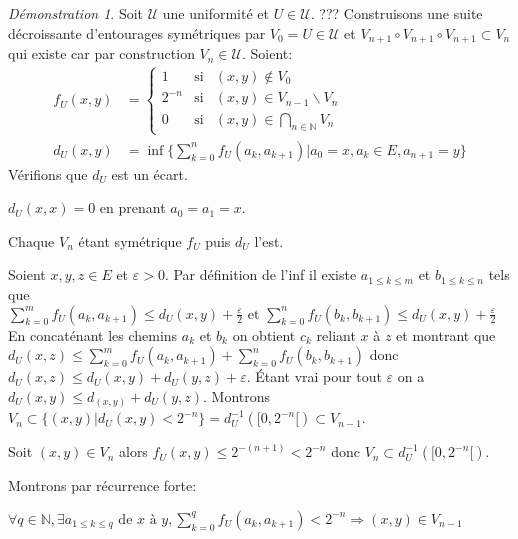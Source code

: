 \documentclass[a4paper, 11pt, french]{book}
\newenvironment{itemise}{\itemize}{\enditemize}
\theoremstyle{plain} %
\theoremstyle{definition} %
\theoremstyle{remark} %
\newtheorem*{demonstration}{Démonstration}
\renewcommand{\setminus}{\backslash}
\newcommand{\1}{\mathds{1}}
\newcommand{\infegal}{\leqslant}
\newcommand{\inv}[1]{#1^{-1}}
\newcommand\et{\text{ et }}
\newcommand{\N}{\mathbb{N}}
\begin{document}
\begin{demonstration}
	\begin{itemise}
		\item Soit $\mathscr{U}$ une uniformité et $U\in\mathscr{U}$. {\color{red} ???}
		Construisons une suite décroissante d'entourages symétriques par $V_0=U\in\mathscr{U}$ et $V_{n+1}\circ V_{n+1}\circ V_{n+1}\subset V_n$ qui existe car par construction $V_n\in\mathscr{U}$.
		Soient:
		\begin{align*}
			f_U(x, y) & =
			\left\{\begin{array}{lll}
				1      & \text{si} & (x, y)\notin V_0               \\
				2^{-n} & \text{si} & (x, y)\in V_{n-1}\setminus V_n \\
				0      & \text{si} & (x, y)\in\bigcap_{n\in\N} V_n
			\end{array}\right.\\
			d_U(x, y) & =\inf\{\sum_{k=0}^nf_U(a_k, a_{k+1})|a_0=x, a_k\in E, a_{n+1}=y\}
		\end{align*}
		Vérifions que $d_U$ est un écart.
		\begin{itemise}
			\item $d_U(x,x)=0$ en prenant $a_0=a_1=x$.
			\item Chaque $V_n$ étant symétrique $f_U$ puis $d_U$ l'est.
			\item Soient $x, y, z\in E$ et $\varepsilon>0$.
			Par définition de l'inf il existe $a_{1\infegal k\infegal m}$ et $b_{1\infegal k\infegal n}$ tels que $\sum_{k=0}^mf_U(a_k, a_{k+1})\infegal d_U(x, y)+\frac{\varepsilon}{2}\et \sum_{k=0}^nf_U(b_k, b_{k+1})\infegal d_U(x, y)+\frac{\varepsilon}{2}$
			En concaténant les chemins $a_k$ et $b_k$ on obtient $c_k$ reliant $x$ à $z$ et montrant que $d_U(x, z)\infegal\sum_{k=0}^mf_U(a_k, a_{k+1})+\sum_{k=0}^nf_U(b_k, b_{k+1})$ donc $d_U(x, z)\infegal d_U(x, y)+d_U(y, z)+\varepsilon$.
			Étant vrai pour tout $\varepsilon$ on a $d_U(x, y)\infegal d_(x, y)+d_U(y, z)$.
		\end{itemise}
		Montrons $V_n\subset\{(x, y)|d_U(x, y)<2^{-n}\}=\inv{d_U}([0,2^{-n}[)\subset V_{n-1}$.
		\begin{itemise}
			\item Soit $(x, y)\in V_n$ alors $f_U(x, y)\infegal 2^{-(n+1)}<2^{-n}$ donc $V_n\subset\inv{d_U}([0,2^{-n}[)$.
			\item Montrons par récurrence forte:
			\begin{itemise}
				\item $\forall q\in\N, \exists a_{1\infegal k\infegal q}\text{ de }x\text{ à }y, \sum_{k=0}^qf_U(a_k, a_{k+1})<2^{-n}\Rightarrow (x, y)\in V_{n-1}$

\end{itemise}
\end{itemise}
\end{itemise}
\end{demonstration}
\end{document}
